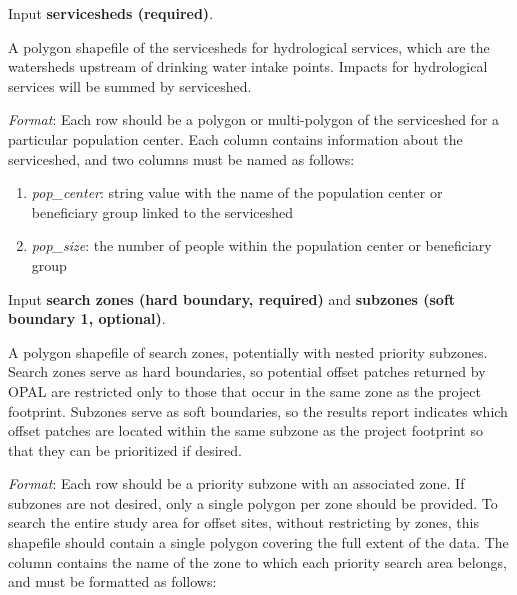 \documentclass[11pt,letterpaper]{report}
\newenvironment{myenumerate}{%
	\edef\backupindent{\the\parindent}
	\enumerate
	\setlength{\parindent}{\backupindent}
		\setlist[enumerate,1]{label=(\arabic*)}
		\setlist[enumerate,2]{label=(\arabic*)}
}{\endenumerate}
\begin{document}
\begin{myenumerate}
		\item Input \textbf{servicesheds (required)}.
		
			A polygon shapefile of the servicesheds for hydrological services, which are the watersheds upstream of drinking water intake points. Impacts for hydrological services will be summed by serviceshed.

			\begin{adjustwidth}{0.25in}{}					
				{\em Format}: Each row should be a polygon or multi-polygon of the serviceshed for a particular population center. Each column contains information about the serviceshed, and two columns must be named as follows:
			\end{adjustwidth}
				
			\begin{enumerate}[leftmargin=0.5in,labelindent=!,itemindent=-0.02in]
				\item {\em	pop\_{}center}: string value with the name of the population center or beneficiary group linked to the serviceshed
				
				\item {\em pop\_{}size}: the number of people within the population center or beneficiary group	
			\end{enumerate}
		
		\item Input \textbf{search zones (hard boundary, required)} and \textbf{subzones (soft boundary 1, optional)}.
		
			A polygon shapefile of search zones, potentially with nested priority subzones. Search zones serve as hard boundaries, so potential offset patches returned by OPAL are restricted only to those that occur in the same zone as the project footprint. Subzones serve as soft boundaries, so the results report indicates which offset patches are located within the same subzone as the project footprint so that they can be prioritized if desired. 

			\begin{adjustwidth}{0.25in}{}				
				{\em Format}: Each row should be a priority subzone with an associated zone. If subzones are not desired, only a single polygon per zone should be provided. To search the entire study area for offset sites, without restricting by zones, this shapefile should contain a single polygon covering the full extent of the data. The column contains the name of the zone to which each priority search area belongs, and must be formatted as follows:
			\end{adjustwidth}
			

\end{myenumerate}
\end{document}
